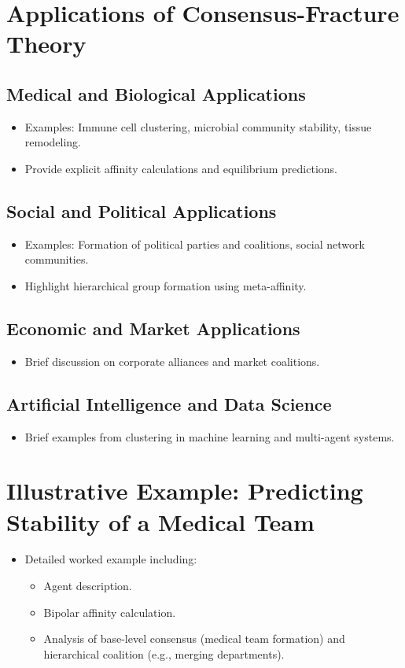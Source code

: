 \documentclass{article}
\begin{document}
\section{Applications of Consensus-Fracture Theory}

\subsection{Medical and Biological Applications}
\begin{itemize}
  \item Examples: Immune cell clustering, microbial community stability, tissue remodeling.
  \item Provide explicit affinity calculations and equilibrium predictions.
\end{itemize}

\subsection{Social and Political Applications}
\begin{itemize}
  \item Examples: Formation of political parties and coalitions, social network communities.
  \item Highlight hierarchical group formation using meta-affinity.
\end{itemize}

\subsection{Economic and Market Applications}
\begin{itemize}
  \item Brief discussion on corporate alliances and market coalitions.
\end{itemize}

\subsection{Artificial Intelligence and Data Science}
\begin{itemize}
  \item Brief examples from clustering in machine learning and multi-agent systems.
\end{itemize}

\section{Illustrative Example: Predicting Stability of a Medical Team}
\begin{itemize}
  \item Detailed worked example including:
  \begin{itemize}
      \item Agent description.
      \item Bipolar affinity calculation.
      \item Analysis of base-level consensus (medical team formation) and hierarchical coalition (e.g., merging departments).
  \end{itemize}
\end{itemize}
\end{document}
